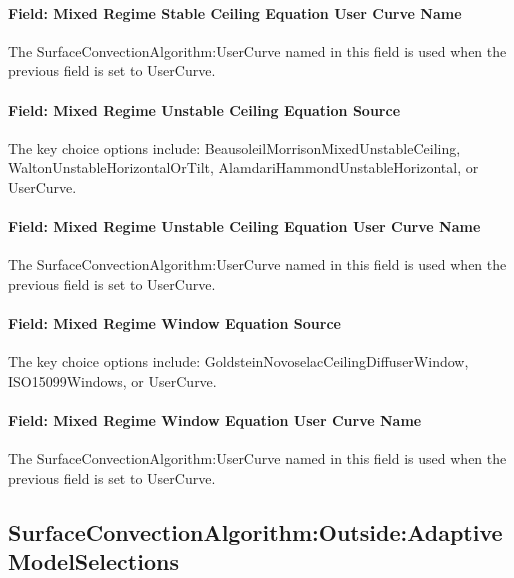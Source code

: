 \paragraph{Field: Mixed Regime Stable Ceiling Equation User Curve Name}\label{field-mixed-regime-stable-ceiling-equation-user-curve-name}

The SurfaceConvectionAlgorithm:UserCurve named in this field is used when the previous field is set to UserCurve.

\paragraph{Field: Mixed Regime Unstable Ceiling Equation Source}\label{field-mixed-regime-unstable-ceiling-equation-source}

The key choice options include: BeausoleilMorrisonMixedUnstableCeiling, WaltonUnstableHorizontalOrTilt, AlamdariHammondUnstableHorizontal, or UserCurve.

\paragraph{Field: Mixed Regime Unstable Ceiling Equation User Curve Name}\label{field-mixed-regime-unstable-ceiling-equation-user-curve-name}

The SurfaceConvectionAlgorithm:UserCurve named in this field is used when the previous field is set to UserCurve.

\paragraph{Field: Mixed Regime Window Equation Source}\label{field-mixed-regime-window-equation-source}

The key choice options include: GoldsteinNovoselacCeilingDiffuserWindow, ISO15099Windows, or UserCurve.

\paragraph{Field: Mixed Regime Window Equation User Curve Name}\label{field-mixed-regime-window-equation-user-curve-name}

The SurfaceConvectionAlgorithm:UserCurve named in this field is used when the previous field is set to UserCurve.

\subsection{SurfaceConvectionAlgorithm:Outside:AdaptiveModelSelections}\label{surfaceconvectionalgorithmoutsideadaptivemodelselections}

